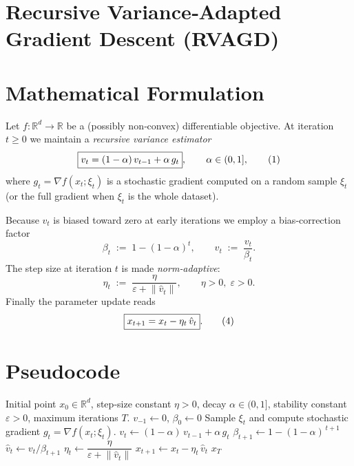 \documentclass[11pt]{article}
\newcommand{\RR}{\mathbb{R}}
\newcommand{\norm}[1]{\left\|#1\right\|}
\newcommand{\grad}{\nabla}
\begin{document}
\section*{Recursive Variance‑Adapted Gradient Descent (RVAGD)}

\section*{Mathematical Formulation}
Let $f:\RR^{d}\to\RR$ be a (possibly non‑convex) differentiable objective.  
At iteration $t\ge 0$ we maintain a \emph{recursive variance estimator}
\[
\boxed{%
v_{t}= (1-\alpha)\,v_{t-1}+ \alpha\, g_{t}},\qquad 
\alpha\in(0,1] ,
\tag{1}
\]
where $g_{t}= \grad f(x_{t};\xi_{t})$ is a stochastic gradient computed on a random
sample $\xi_{t}$ (or the full gradient when $\xi_{t}$ is the whole dataset).  

Because $v_{t}$ is biased toward zero at early iterations we employ a bias‑correction
factor
\[
\beta_{t}\;:=\;1-(1-\alpha)^{t},\qquad 
\hat v_{t}\;:=\;\frac{v_{t}}{\beta_{t}} .
\tag{2}
\]
The step size at iteration $t$ is made \emph{norm‑adaptive}:
\[
\eta_{t}\;:=\;\frac{\eta}{\varepsilon+\norm{\hat v_{t}}},\qquad 
\eta>0,\;\varepsilon>0 .
\tag{3}
\]
Finally the parameter update reads
\[
\boxed{%
x_{t+1}=x_{t}-\eta_{t}\,\hat v_{t}} .
\tag{4}
\]

\section*{Pseudocode}
\begin{algorithm}[H]
\caption{Recursive Variance‑Adapted Gradient Descent (RVAGD)}
\begin{algorithmic}[1]
\Require Initial point $x_{0}\in\RR^{d}$, step‑size constant $\eta>0$, 
          decay $\alpha\in(0,1]$, stability constant $\varepsilon>0$, 
          maximum iterations $T$.
\State $v_{-1}\gets 0$, $\beta_{0}\gets 0$ 
    \State Sample $\xi_{t}$ and compute stochastic gradient 
          $g_{t}= \grad f(x_{t};\xi_{t})$.
    \State $v_{t}\gets (1-\alpha)\,v_{t-1}+ \alpha\, g_{t}$ \hfill{}
    \State $\beta_{t+1}\gets 1-(1-\alpha)^{\,t+1}$ \hfill{}
    \State $\hat v_{t}\gets v_{t}/\beta_{t+1}$ \hfill{}
    \State $\eta_{t}\gets \dfrac{\eta}{\varepsilon+\norm{\hat v_{t}}}$ \hfill{}
    \State $x_{t+1}\gets x_{t}-\eta_{t}\,\hat v_{t}$ \hfill{}
\EndFor
\State \Return $x_{T}$
\end{algorithmic}
\end{algorithm}
\end{document}
